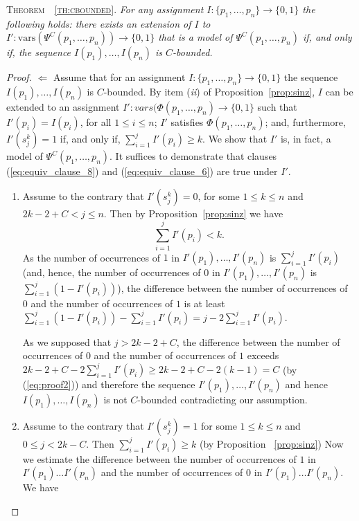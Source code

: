 \documentclass{article} \usepackage[utf8]{inputenc}
\newcommand*{\Eq}{\ensuremath{\Psi}}
\newcommand*{\vars}{\ensuremath{\mathrm{vars}}}
\begin{document}
\smallskip 

\textsc{Theorem~~\ref{th:cbounded}. }
{\it
For any assignment $I:\{p_1,\dots,p_n\}\to\{0,1\}$ the following holds: 
there exists an extension of $I$ to $I': \vars(\Eq^{C}(p_1,\dots,p_n))\to\{0,1\}$ that is 
a model of $\Eq^{C}(p_1,\dots,p_n)$ if, and only if, 
the sequence $I(p_1),\dots, I(p_n)$ is $C$-bounded.
}
\begin{proof}
$\Longleftarrow$
Assume that for an assignment $I: \{p_{1}, \ldots, p_{n}\} \rightarrow \{0,1\}$ 
the sequence $I(p_{1}), \ldots, I(p_{n})$ is $C$-bounded. 
By item (\textit{ii}) of Proposition~\ref{prop:sinz}, $I$
can be extended to an assignment $I': vars(\Phi(p_{1}, \ldots, p_{n}) \rightarrow \{0,1\}$ 
such that 
$I'(p_{i}) = I(p_{i})$, for all $1 \le i \le n$; 
$I'$ satisfies $\Phi(p_{1}, \ldots , p_{n})$; 
and, furthermore, $I'(s_{j}^{k}) = 1$  if, and only if, $\sum_{i=1}^{j} I'(p_{i})  \ge k$. 
We show that $I'$ is, in fact,  a model of $\Psi^{C}(p_{1}, \ldots, p_{n})$. It suffices 
to demonstrate that clauses
(\ref{eq:equiv_clause_8}) and 
(\ref{eq:equiv_clause_6}) are true under $I'$.
\begin{enumerate}
\item
Assume to the contrary that $I'(s_{j}^{k}) = 0$,  for some $1 \le k \le n$ and $2k-2+C < j \le n$. 
Then by Proposition~\ref{prop:sinz} we have 
\begin{equation}\label{eq:proof2}
    \sum_{i=1}^{j}I'(p_{i}) < k.
\end{equation}
As the number of occurrences of $1$ in  $I'(p_{1}), \ldots,I'( p_{n})$ is 
$\sum_{i=1}^{j} I'(p_{i})$
(and, hence,
the number of occurrences of $0$ in  $I'(p_{1}), \ldots,I'( p_{n})$ is 
$\sum_{i=1}^{j} (1-I'(p_{i}))$), 
the difference  between the number of occurrences of $0$ and the number of occurrences  of $1$ is
at least $\sum_{i=1}^{j} (1-I'(p_{i})) - \sum_{i=1}^{j} I'(p_{i}) = j - 2\sum_{i=1}^{j} I'(p_{i})$.

As we supposed that $j > 2k-2+C$, the difference  between the number of
occurrences of $0$ and the number of occurrences  of $1$ exceeds $ 2k -2 + C -
2\sum_{i=1}^{j} I'(p_{i}) \geq  2k -2  + C - 2(k-1) = C$ (by  (\ref{eq:proof2}))
and therefore  the sequence
$I'(p_{1}), \ldots, I'(p_{n})$ and hence $I(p_{1}), \ldots, I(p_{n})$ is not
$C$-bounded contradicting our assumption. 


\item  Assume to the contrary that $I'(s_{j}^{k}) = 1$  for some $1 \le k \le n$ and $0\le j < 2k-C$.  
Then $\sum_{i=1}^{j}I'(p_{i}) \ge  k$  (by Proposition ~\ref{prop:sinz})
Now we estimate the difference between the number of occurrences 
of $1$ in $I'(p_{1}) \ldots I'(p_{n})$ and the number
of occurrences of $0$ in $I'(p_{1}) \ldots I'(p_{n})$. 
We have 


\end{enumerate}
\end{proof}
\end{document}
